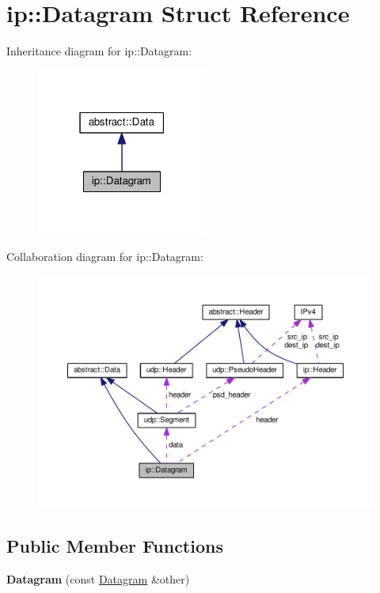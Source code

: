 \hypertarget{structip_1_1Datagram}{}\section{ip\+:\+:Datagram Struct Reference}
\label{structip_1_1Datagram}


Inheritance diagram for ip\+:\+:Datagram\+:\nopagebreak
\begin{figure}[H]
\begin{center}
\leavevmode
\includegraphics[width=159pt]{structip_1_1Datagram__inherit__graph}
\end{center}
\end{figure}


Collaboration diagram for ip\+:\+:Datagram\+:
\nopagebreak
\begin{figure}[H]
\begin{center}
\leavevmode
\includegraphics[width=350pt]{structip_1_1Datagram__coll__graph}
\end{center}
\end{figure}
\subsection*{Public Member Functions}
\begin{DoxyCompactItemize}
\item 
{\bfseries Datagram} (const \hyperlink{structip_1_1Datagram}{Datagram} \&other)\hypertarget{structip_1_1Datagram_a9b701e9ceeeacc10ae5df56bccde8f51}{}\label{structip_1_1Datagram_a9b701e9ceeeacc10ae5df56bccde8f51}

\end{DoxyCompactItemize}
